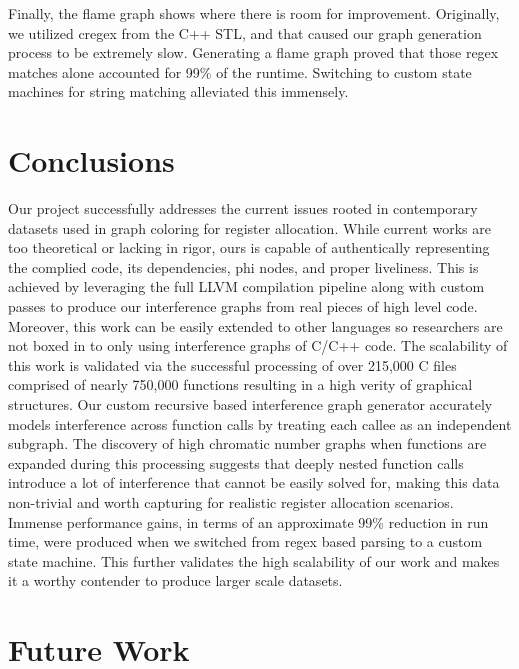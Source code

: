 \documentclass{article}
\begin{document}
Finally, the flame graph shows where there is room for improvement. Originally, we utilized cregex from the C++ STL, and that caused our graph generation process to be extremely slow. Generating a flame graph proved that those regex matches alone accounted for 99\% of the runtime. Switching to custom state machines for string matching alleviated this immensely.

\section{Conclusions}

Our project successfully addresses the current issues rooted in contemporary datasets used in graph coloring for register allocation. While current works are too theoretical or lacking in rigor, ours is capable of authentically representing the complied code, its dependencies, phi nodes, and proper liveliness. This is achieved by leveraging the full LLVM compilation pipeline along with custom passes to produce our interference graphs from real pieces of high level code. Moreover, this work can be easily extended to other languages so researchers are not boxed in to only using interference graphs of C/C++ code. The scalability of this work is validated via the successful processing of over 215,000 C files comprised of nearly 750,000 functions resulting in a high verity of graphical structures. Our custom recursive based interference graph generator accurately models interference across function calls by treating each callee as an independent subgraph. The discovery of high chromatic number graphs when functions are expanded during this processing suggests that deeply nested function calls introduce a lot of interference that cannot be easily solved for, making this data non-trivial and worth capturing for realistic register allocation scenarios. Immense performance gains, in terms of an approximate 99\% reduction in run time, were produced when we switched from regex based parsing to a custom state machine. This further validates the high scalability of our work and makes it a worthy contender to produce larger scale datasets.

\section{Future Work}
\end{document}

